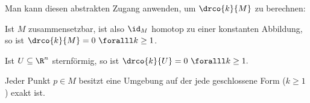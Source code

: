 Man kann diesen abstrakten Zugang anwenden, um \( \drco{k}{M} \) zu berechnen:

\begin{lem}
	Ist $M$ zusammensetzbar, ist also $\id_M$ homotop zu einer konstanten Abbildung, so ist \( \drco{k}{M} = 0 \ \foralll k \geq 1 \).
\end{lem}

\begin{thm}
	Ist $U \subseteq \R^n$ sternförmig, so ist \( \drco{k}{U} = 0 \ \foralll k \geq 1. \)
\end{thm}

\begin{cor*}
	Jeder Punkt $p \in M$ besitzt eine Umgebung auf der jede geschlossene Form ($k \geq 1$) exakt ist.
\end{cor*}